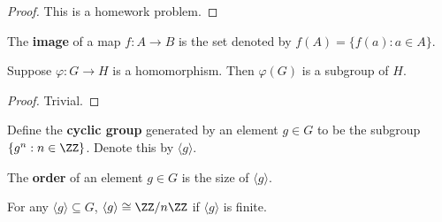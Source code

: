 \begin{proof}
This is a homework problem.
\end{proof}

\begin{df}
The \textbf{image} of a map $f : A \to B$ is the set denoted by $f(A) =
\lbrace f(a) : a \in A \rbrace$.
\end{df}

\begin{prop}
Suppose $\varphi : G \to H$ is a homomorphism. Then $\varphi(G)$ is a
subgroup of $H$.
\end{prop}

\begin{proof}
Trivial.
\end{proof}

\begin{df}
Define the \textbf{cyclic group} generated by an element $g \in G$ to be
the subgroup $\lbrace g^n : n \in \ZZ \rbrace$. Denote this by $\langle
g \rangle$.
\end{df}

\begin{df}
The \textbf{order} of an element $g \in G$ is the size of $\langle g
\rangle$.
\end{df}

\begin{rem}
For any $\langle g \rangle \subseteq G$, $\langle g \rangle \cong
\ZZ/n\ZZ$ if $\langle g \rangle$ is finite.
\end{rem}

